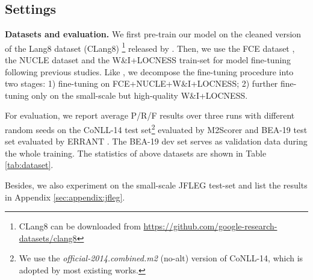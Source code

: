 \documentclass[11pt]{article}
\begin{document}
\begin{table*}[tp!]
{\begin{tabular}{clcccccccc}
\bottomrule
\end{tabular}
}
\caption{\textbf{Single-model} results on English GEC test-sets. Our results are averaged over three runs with different random seeds. \textbf{Layer}, \textbf{Hidden} and \textbf{FFN} denote the depth, hidden size and feed-forward network size of Transformer. ``\textbf{w/ PLM}'' means using pre-trained language models. ``\textbf{w/ syntax}'' means using syntactic knowledge. Besides the public human-annotated training data, current GEC systems variously use private and/or artificial data, including: artificial Gigaword (70M sentences), Wikipedia revision histories (170M), artificial Wikipedia (170M), artificial Colossal Clean Crawled Corpus (200M), artificial one-billion-word (9M), artificial one-billion-word (10M), artificial one-billion-word (30M) , cleaned version of Lang8 (2.4M).}

\label{tab:main:results}
\end{table*} \subsection{Settings}
\label{sec:english:exp}
\textbf{Datasets and evaluation.} We first pre-train our model on the cleaned version of the Lang8 dataset (CLang8) \footnote{CLang8 can be downloaded from \url{https://github.com/google-research-datasets/clang8}} released by \citet{rothe2021recipe}. Then, we use the FCE dataset \citep{yannakoudakis2011new}, the NUCLE dataset \citep{dahlmeier2013building} and the W\&I+LOCNESS train-set \citep{bryant2019bea} for model fine-tuning following previous studies. Like \citet{omelianchuk2020gector}, we decompose the fine-tuning procedure into two stages: 1) fine-tuning on FCE+NUCLE+W\&I+LOCNESS; 2) further fine-tuning only on the small-scale but high-quality W\&I+LOCNESS. 

For evaluation, we report average P/R/F results over three runs with different random seeds on the CoNLL-14 test set\footnote{We use the \textit{official-2014.combined.m2} (no-alt) version of CoNLL-14, which is adopted by most existing works.}
\citep{ng2014conll} evaluated by M2Scorer \citep{dahlmeier2012better} and BEA-19 test set \citep{bryant2019bea} evaluated by ERRANT \citep{bryant2017automatic}. The BEA-19 dev set serves as validation data during the whole training. The statistics of above datasets are shown in Table \ref{tab:dataset}. 

Besides, we also experiment on the small-scale JFLEG test-set \cite{napoles2017jfleg} and list the results in Appendix \ref{sec:appendix:jfleg}.
\end{document}
